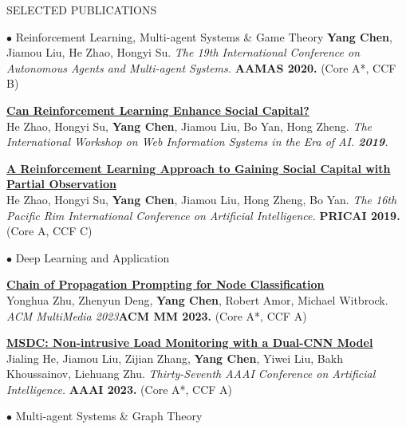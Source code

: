 \documentclass{resume} %
\begin{document}
\begin{rSection}{SELECTED PUBLICATIONS}
\begin{rSubsection}{\large $\bullet$ Reinforcement Learning, Multi-agent Systems \& Game Theory}{}{}{}
		\textbf{Yang Chen}, Jiamou Liu, He Zhao, Hongyi Su. {\em The 19th International Conference on Autonomous Agents and Multi-agent Systems.} \textbf{AAMAS 2020.} (Core A*, CCF B)\\
	\item {\href{https://link.springer.com/chapter/10.1007/978-981-15-3281-8_14}{\bf Can Reinforcement Learning Enhance Social Capital?}}\\
		He Zhao, Hongyi Su, \textbf{Yang Chen}, Jiamou Liu, Bo Yan, Hong Zheng. {\em The International Workshop on Web Information Systems in the Era of AI. {\bf 2019}.}\\
	\item {\href{https://link.springer.com/chapter/10.1007/978-3-030-29908-8_9}{\bf A Reinforcement Learning Approach to Gaining Social Capital with Partial Observation}}\\
		He Zhao, Hongyi Su, \textbf{Yang Chen}, Jiamou Liu, Hong Zheng, Bo Yan. {\em The 16th Pacific Rim International Conference on Artificial Intelligence.} \textbf{PRICAI 2019.} (Core A, CCF C)\\
\end{rSubsection}


\begin{rSubsection}{\large $\bullet$ Deep Learning and Application}{}{}{}
\item{
	\href{}{\bf Chain of Propagation Prompting for Node Classification}}\\
	Yonghua Zhu, Zhenyun Deng, \textbf{Yang Chen}, Robert Amor, Michael Witbrock. {\em ACM MultiMedia 2023}\textbf{ACM MM 2023.} (Core A*, CCF A)
\item {
	\href{}{\bf MSDC: Non-intrusive Load Monitoring with a Dual-CNN Model}}\\
		Jialing He, Jiamou Liu, Zijian Zhang, \textbf{Yang Chen}, Yiwei Liu, Bakh Khoussainov, Liehuang Zhu. {\em Thirty-Seventh AAAI Conference on Artificial Intelligence.} \textbf{AAAI 2023.} (Core A*, CCF A)\\
\end{rSubsection}


\begin{rSubsection}{\large $\bullet$ Multi-agent Systems \& Graph Theory}{}{}{}
	

\end{rSubsection}
\end{rSection}
\end{document}
